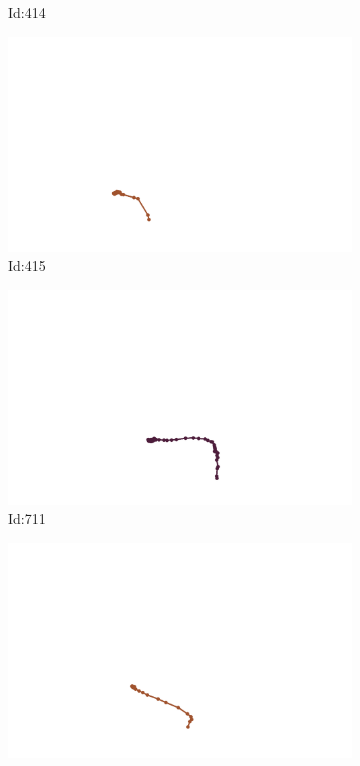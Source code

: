 \documentclass[12pt,twoside]{report}
\begin{document}
\begin{figure}
\begin{subfigure}[b]{0.20\textwidth}
\caption{Id:414}
\end{subfigure}
\begin{subfigure}[b]{0.20\textwidth}
\centering
\includegraphics[width=\textwidth]{../../trajectories/415.png}
\caption{Id:415}
\end{subfigure}
\begin{subfigure}[b]{0.20\textwidth}
\centering
\includegraphics[width=\textwidth]{../../trajectories/711.png}
\caption{Id:711}
\end{subfigure}
\begin{subfigure}[b]{0.20\textwidth}
\centering
\includegraphics[width=\textwidth]{../../trajectories/775.png}

\end{subfigure}
\end{figure}
\end{document}
